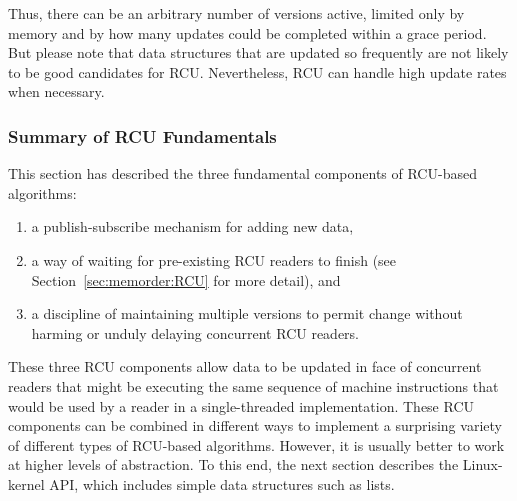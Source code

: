 {{	Thus, there can be an arbitrary number of versions active,
	limited only by memory and by how many updates could be completed
	within a grace period.
	But please note that data structures that are updated so frequently
	are not likely to be good candidates for RCU.
	Nevertheless, RCU can handle high update rates when necessary.
}\QuickQuizEndE
}

\subsubsection{Summary of RCU Fundamentals}
\label{sec:defer:Summary of RCU Fundamentals}

This section has described the three fundamental components of RCU-based
algorithms:

\begin{enumerate}
\item	a publish-subscribe mechanism for adding new data,

\item	a way of waiting for pre-existing RCU readers to finish
	(see Section~\ref{sec:memorder:RCU} for more detail),
	and

\item	a discipline of maintaining multiple versions to permit
	change without harming or unduly delaying concurrent RCU readers.
\end{enumerate}

\QuickQuizEnd

These three RCU components allow data to be updated in face of concurrent
readers that might be executing the same sequence of machine instructions
that would be used by a reader in a single-threaded implementation.
These RCU components can be combined in different ways to implement a
surprising variety of different types of RCU-based algorithms.
However, it is usually better to work at higher levels of abstraction.
To this end, the next section describes the Linux-kernel API, which
includes simple data structures such as lists.
